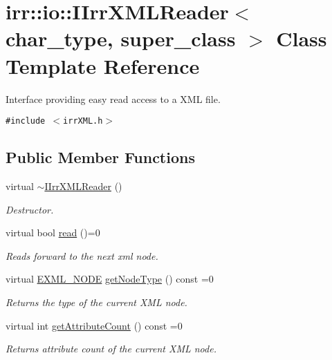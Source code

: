 \hypertarget{classirr_1_1io_1_1_i_irr_x_m_l_reader}{
\section{irr::io::IIrrXMLReader$<$ char\_\-type, super\_\-class $>$ Class Template Reference}
\label{classirr_1_1io_1_1_i_irr_x_m_l_reader}
}
Interface providing easy read access to a XML file.  


{\tt \#include $<$irrXML.h$>$}

\subsection*{Public Member Functions}
\begin{CompactItemize}
\item 
virtual \hyperlink{classirr_1_1io_1_1_i_irr_x_m_l_reader_d1d9faeae926afc224d9dea0ad7a08ac}{$\sim$IIrrXMLReader} ()
\begin{CompactList}\small\item\em Destructor. \item\end{CompactList}\item 
virtual bool \hyperlink{classirr_1_1io_1_1_i_irr_x_m_l_reader_157f458f7dabeeff173f72a0fb443a8e}{read} ()=0
\begin{CompactList}\small\item\em Reads forward to the next xml node. \item\end{CompactList}\item 
virtual \hyperlink{namespaceirr_1_1io_86a02676c9cbb822e04d60c81b4f33ed}{EXML\_\-NODE} \hyperlink{classirr_1_1io_1_1_i_irr_x_m_l_reader_3482e8e6bdc15965fc6a0bcef6e9a8e0}{getNodeType} () const =0
\begin{CompactList}\small\item\em Returns the type of the current XML node. \item\end{CompactList}\item 
virtual int \hyperlink{classirr_1_1io_1_1_i_irr_x_m_l_reader_eaa1cfc860be7b788f78edec403cc2a2}{getAttributeCount} () const =0
\begin{CompactList}\small\item\em Returns attribute count of the current XML node. \item\end{CompactList}\item 

\end{CompactItemize}

